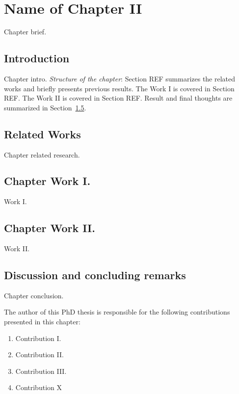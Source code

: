 \chapter{Name of Chapter II}
\label{chapter_2}

Chapter brief.

\section{Introduction}
Chapter intro.
\textit{Structure of the chapter}: Section REF summarizes the related works and briefly presents previous results. The Work I is covered in Section REF. The Work II is covered in Section REF. Result and final thoughts are summarized in Section~\ref{ch2:contrib}.
\section{Related Works}
Chapter related research.

\section{Chapter Work I.}
Work I. \cite{b:isis-tracking-techreport}
\section{Chapter Work II.}
Work II. \cite{b:mays01}
\section{Discussion and concluding remarks}
\label{ch2:contrib}

Chapter conclusion.

The author of this PhD thesis is responsible for the following contributions presented in this chapter:
\begin{enumerate}[wide = 0pt, widest = {II/5.}, leftmargin =*]
	\item[II/1.] Contribution I.
	
    \item[II/2.] Contribution II.
	
    \item[II/3.] Contribution III.
	
    \item[II/4.] Contribution X
\end{enumerate}
